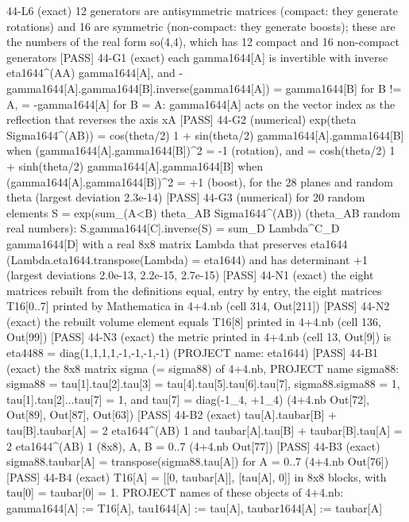 \documentclass[
  10pt,
]{article}
\newenvironment{Shaded}{}{}
\newcommand{\NormalTok}[1]{#1}
\begin{document}
\begin{Shaded}
\begin{Highlighting}[]
\NormalTok{[PASS] 44{-}L6  (exact) 12 generators are antisymmetric matrices (compact: they generate rotations) and 16 are symmetric (non{-}compact: they generate boosts); these are the numbers of the real form so(4,4), which has 12 compact and 16 non{-}compact generators}
\NormalTok{[PASS] 44{-}G1  (exact) each gamma1644[A] is invertible with inverse eta1644\^{}(AA) gamma1644[A], and {-}gamma1644[A].gamma1644[B].inverse(gamma1644[A]) = gamma1644[B] for B != A, = {-}gamma1644[A] for B = A: gamma1644[A] acts on the vector index as the reflection that reverses the axis xA}
\NormalTok{[PASS] 44{-}G2  (numerical) exp(theta Sigma1644\^{}(AB)) = cos(theta/2) 1 + sin(theta/2) gamma1644[A].gamma1644[B] when (gamma1644[A].gamma1644[B])\^{}2 = {-}1 (rotation), and = cosh(theta/2) 1 + sinh(theta/2) gamma1644[A].gamma1644[B] when (gamma1644[A].gamma1644[B])\^{}2 = +1 (boost), for the 28 planes and random theta (largest deviation 2.3e{-}14)}
\NormalTok{[PASS] 44{-}G3  (numerical) for 20 random elements S = exp(sum\_(A\textless{}B) theta\_AB Sigma1644\^{}(AB)) (theta\_AB random real numbers):  S.gamma1644[C].inverse(S) = sum\_D Lambda\^{}C\_D gamma1644[D] with a real 8x8 matrix Lambda that preserves eta1644 (Lambda.eta1644.transpose(Lambda) = eta1644) and has determinant +1 (largest deviations 2.0e{-}13, 2.2e{-}15, 2.7e{-}15)}
\NormalTok{[PASS] 44{-}N1  (exact) the eight matrices rebuilt from the definitions equal, entry by entry, the eight matrices T16[0..7] printed by Mathematica in 4+4.nb (cell 314, Out[211])}
\NormalTok{[PASS] 44{-}N2  (exact) the rebuilt volume element equals T16[8] printed in 4+4.nb (cell 136, Out[99])}
\NormalTok{[PASS] 44{-}N3  (exact) the metric printed in 4+4.nb (cell 13, Out[9]) is eta4488 = diag(1,1,1,1,{-}1,{-}1,{-}1,{-}1) (PROJECT name: eta1644)}
\NormalTok{[PASS] 44{-}B1  (exact) the 8x8 matrix sigma (= sigma88) of 4+4.nb, PROJECT name sigma88: sigma88 = tau[1].tau[2].tau[3] = tau[4].tau[5].tau[6].tau[7], sigma88.sigma88 = 1, tau[1].tau[2]...tau[7] = 1, and tau[7] = diag({-}1\_4, +1\_4) (4+4.nb Out[72], Out[89], Out[87], Out[63])}
\NormalTok{[PASS] 44{-}B2  (exact) tau[A].taubar[B] + tau[B].taubar[A] = 2 eta1644\^{}(AB) 1 and taubar[A].tau[B] + taubar[B].tau[A] = 2 eta1644\^{}(AB) 1 (8x8), A, B = 0..7 (4+4.nb Out[77])}
\NormalTok{[PASS] 44{-}B3  (exact) sigma88.taubar[A] = transpose(sigma88.tau[A]) for A = 0..7 (4+4.nb Out[76])}
\NormalTok{[PASS] 44{-}B4  (exact) T16[A] = [[0, taubar[A]], [tau[A], 0]] in 8x8 blocks, with tau[0] = taubar[0] = 1.  PROJECT names of these objects of 4+4.nb: gamma1644[A] := T16[A], tau1644[A] := tau[A], taubar1644[A] := taubar[A]}

\end{Highlighting}
\end{Shaded}
\end{document}
